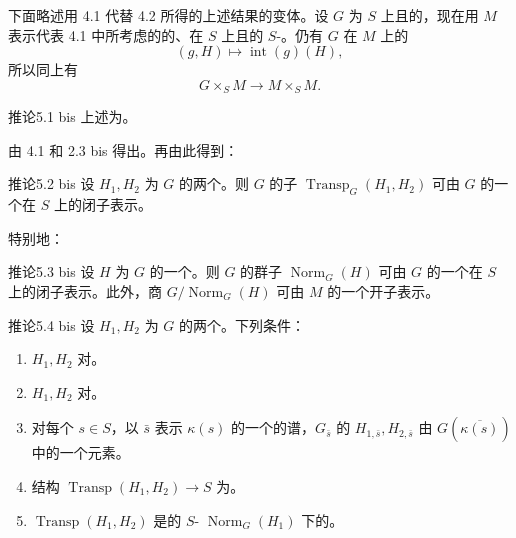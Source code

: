 下面略述用 4.1 代替 4.2 所得的上述结果的变体。设 $G$ 为 $S$ 上且的，现在用 $M$ 表示代表 4.1 中所考虑的的、在 $S$ 上且的 $S$-。仍有 $G$ 在 $M$ 上的
\[(g,H)\longmapsto\operatorname{int}(g)(H),\]
所以同上有
\[\tag{x bis}G\times_S M\longrightarrow M\times_S M.\]
\begin{SGAresult}{推论}{5.1 bis}
上述为。
\end{SGAresult}
由 4.1 和 2.3 bis 得出。再由此得到：
\begin{SGAresult}{推论}{5.2 bis}
设 $H_1,H_2$ 为 $G$ 的两个。则 $G$ 的子 $\operatorname{Transp}_G(H_1,H_2)$ 可由 $G$ 的一个在 $S$ 上的闭子表示。
\end{SGAresult}
特别地：
\begin{SGAresult}{推论}{5.3 bis}
设 $H$ 为 $G$ 的一个。则 $G$ 的群子 $\operatorname{Norm}_G(H)$ 可由 $G$ 的一个在 $S$ 上的闭子表示。此外，商 $G/\operatorname{Norm}_G(H)$ 可由 $M$ 的一个开子表示。
\end{SGAresult}
\begin{SGAresult}{推论}{5.4 bis}
设 $H_1,H_2$ 为 $G$ 的两个。下列条件：
\begin{enumerate}
\item[(i)] $H_1,H_2$ 对。
\item[(i bis)] $H_1,H_2$ 对。
\item[(ii)] 对每个 $s\in S$，以 $\bar s$ 表示 $\kappa(s)$ 的一个的谱，$G_{\bar s}$ 的 $H_{1,\bar s},H_{2,\bar s}$ 由 $G(\overline{\kappa(s)})$ 中的一个元素。
\item[(ii bis)] 结构 $\operatorname{Transp}(H_1,H_2)\to S$ 为。
\item[(iii)] $\operatorname{Transp}(H_1,H_2)$ 是的 $S$- $\operatorname{Norm}_G(H_1)$ 下的。
\end{enumerate}
\end{SGAresult}
